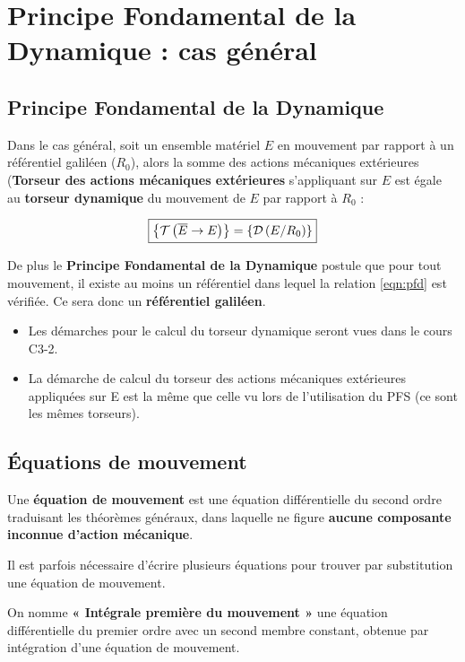 \documentclass[10pt,fleqn]{article} %
\begin{document}

\section{Principe Fondamental de la Dynamique : cas général}

\subsection{Principe Fondamental de la Dynamique}

\begin{definition}
Dans le cas général, soit un ensemble matériel $E$ en mouvement par rapport à un référentiel galiléen ($R_0$), alors la somme des actions mécaniques extérieures (\textbf{Torseur des actions mécaniques extérieures} s'appliquant sur $E$ est égale au \textbf{torseur dynamique} du mouvement de $E$ par rapport à $R_0$ :

\begin{align}\label{eqn:pfd}
\boxed{
\left\{\mathcal{T} \left(\overline{E}\rightarrow E \right) \right\}=\left\{\mathcal{D} \left(E/R_0 \right) \right\}
}
\end{align}

De plus le \textbf{Principe Fondamental de la Dynamique} postule que pour tout mouvement, il existe au moins un référentiel dans lequel la relation \ref{eqn:pfd} est vérifiée. Ce sera donc un \textbf{référentiel galiléen}.

\end{definition}

\begin{rem}
\begin{itemize}
\item Les démarches pour le calcul du torseur dynamique seront vues dans le cours C3-2.
\item La démarche de calcul du torseur des actions mécaniques extérieures appliquées sur E est la  même que celle vu lors de l'utilisation du PFS (ce sont les mêmes torseurs). 
\end{itemize}
\end{rem}

\subsection{Équations de mouvement}

\begin{definition}
Une \textbf{équation de mouvement} est une équation différentielle du second ordre traduisant les théorèmes généraux, dans laquelle ne figure \textbf{aucune composante inconnue d'action mécanique}. 

Il est parfois nécessaire d'écrire plusieurs équations pour trouver par substitution une équation de mouvement. 

On nomme \textbf{« Intégrale première du mouvement »} une équation différentielle du premier ordre avec un second membre constant, obtenue par  intégration d'une équation de mouvement. 
\end{definition}
\end{document}
